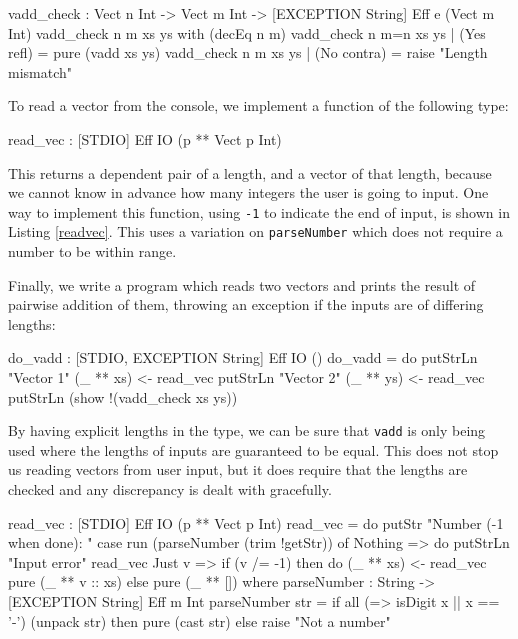 \begin{code}
vadd_check : Vect n Int -> Vect m Int ->
             { [EXCEPTION String] } Eff e (Vect m Int)
vadd_check {n} {m} xs ys with (decEq n m)
  vadd_check {n} {m=n} xs ys | (Yes refl) = pure (vadd xs ys)
  vadd_check {n} {m}   xs ys | (No contra) = raise "Length mismatch"
\end{code}

\noindent
To read a vector from the console, we implement a function of the following
type:

\begin{code}
read_vec : { [STDIO] } Eff IO (p ** Vect p Int)
\end{code}

\noindent
This returns a dependent pair of a length, and a vector of that length, because
we cannot know in advance how many integers the user is going to input.
One way to implement this function, using \texttt{-1} to indicate the end
of input, is shown in Listing \ref{readvec}. This uses a variation on
\texttt{parseNumber} which does not require a number to be within range.

Finally, we write a program which reads two vectors and prints the result
of pairwise addition of them, throwing an exception if the inputs are of
differing lengths:

\begin{code}
do_vadd : { [STDIO, EXCEPTION String] } Eff IO ()
do_vadd = do putStrLn "Vector 1"
             (_ ** xs) <- read_vec
             putStrLn "Vector 2"
             (_ ** ys) <- read_vec
             putStrLn (show !(vadd_check xs ys))
\end{code}

\noindent
By having explicit lengths in the type, we can be sure that \texttt{vadd} is
only being used where the lengths of inputs are guaranteed to be equal. This
does not stop us reading vectors from user input, but it does require that
the lengths are checked and any discrepancy is dealt with gracefully.

\begin{code}[float=h,frame=single,caption={Reading a vector from the console},label=readvec]
read_vec : { [STDIO] } Eff IO (p ** Vect p Int)
read_vec = do putStr "Number (-1 when done): "
              case run (parseNumber (trim !getStr)) of
                   Nothing => do putStrLn "Input error"
                                 read_vec
                   Just v => if (v /= -1)
                                then do (_ ** xs) <- read_vec
                                        pure (_ ** v :: xs)
                                else pure (_ ** [])
  where
    parseNumber : String -> { [EXCEPTION String] } Eff m Int
    parseNumber str
      = if all (\x => isDigit x || x == '-') (unpack str)
           then pure (cast str)
           else raise "Not a number"
\end{code}

